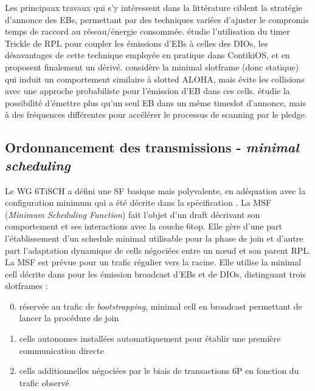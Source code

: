 \documentclass[]{report}
\begin{document}
\par Les principaux travaux qui s'y intéressent dans la littérature ciblent la stratégie d'annonce des EBs, permettant par des techniques variées d'ajuster le compromis temps de raccord au réseau/énergie consommée. \cite{join-TSCH-RPL} étudie l'utilisation du timer Trickle de RPL pour coupler les émissions d'EBs à celles des DIOs, les désavantages de cette technique employée en pratique dans ContikiOS, et en proposent finalement un dérivé. \cite{broadcast-strategies} considère la minimal slotframe (donc statique) qui induit un comportement similaire à slotted ALOHA, mais évite les collisions avec une approche probabiliste pour l'émission d'EB dans ces cells. \cite{ATP} étudie la possibilité d'émettre plus qu'un seul EB dans un même timeslot d'annonce, mais à des fréquences différentes pour accélérer le processus de scanning par le pledge.


\newpage

	\subsection{Ordonnancement des transmissions - \textit{minimal scheduling}}
	\label{scheduling}

    Le WG 6TiSCH a défini une SF basique mais polyvalente, en adéquation avec la configuration minimum qui a été décrite dans la spécification \cite{ietf-6tisch-minimal-security-15}. La MSF (\textit{Minimum Scheduling Function}) fait l'objet d'un draft \cite{ietf-6tisch-msf-10} décrivant son comportement et ses interactions avec la couche 6top. Elle gère d'une part l'établissement d'un schedule minimal utilisable pour la phase de join et d'autre part l'adaptation dynamique de cells négociées entre un nœud et son parent RPL. La MSF est prévue pour un trafic régulier vers la racine. Elle utilise la minimal cell décrite dans \cite{ietf-6tisch-minimal-security-15} pour les émission broadcast d'EBs et de DIOs, distinguant trois slotframes :
    
\begin{enumerate}
\setcounter{enumi}{-1}
\item réservée au trafic de \textit{bootstrapping}, minimal cell en broadcast permettant de lancer la procédure de join
\item cells autonomes installées automatiquement pour établir une première communication directe
\item cells additionnelles négociées par le biais de transactions 6P en fonction du trafic observé
\end{enumerate}
\end{document}
